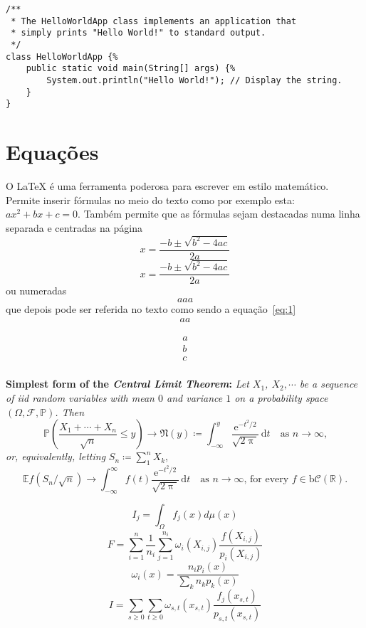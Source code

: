 \lstset{language=Java, caption=Hello World, label=lst:HelloWorld}
\begin{lstlisting}
/** 
 * The HelloWorldApp class implements an application that
 * simply prints "Hello World!" to standard output.
 */
class HelloWorldApp {%
    public static void main(String[] args) {%
        System.out.println("Hello World!"); // Display the string.
    }
}
\end{lstlisting}

\section{Equações}

O LaTeX é uma ferramenta poderosa para escrever em estilo matemático. Permite inserir fórmulas no meio do texto como por exemplo esta: $ax^2 + bx + c = 0$. Também permite que as fórmulas sejam destacadas numa linha separada e centradas na página 
$$x = \frac{-b \pm \sqrt{b^2-4ac}}{2a}$$
\[x = \frac{-b \pm \sqrt{b^2-4ac}}{2a}\]
ou numeradas 
\begin{equation}
aaa
\label{eq:1}
\end{equation}
que depois pode ser referida no texto como sendo a equação~\ref{eq:1}
$$\begin{array}{l}
aa
\end{array}
$$

\begin{eqnarray}
a\\
b\\
c\\
\end{eqnarray}

\textbf{Simplest form of the \textit{Central Limit Theorem}:} \textit{Let
$X_1$, $X_2,\cdots$ be a sequence of iid random variables with mean $0$ 
and variance $1$ on a probability space $(\Omega,\mathcal{F},\mathbb{P})$. Then}
\[\mathbb{P}\left(\frac{X_1+\cdots+X_n}{\sqrt{n}}\le y\right)\to\mathfrak{N}(y)\coloneq
\int_{-\infty}^y \frac{\mathrm{e}^{-t^2/2}}{\sqrt{2\uppi}}\,
\mathrm{d}t\quad\mbox{as $n\to\infty$,}\]
\textit{or, equivalently, letting} $S_n\coloneq\sum_1^n X_k$,
\[\mathbb{E} f\left(S_n/\sqrt{n}\right)\to \int_{-\infty}^\infty f(t)
\frac{\mathrm{e}^{-t^2/2}}{\sqrt{2\uppi}}\,\mathrm{d}t
\quad\mbox{as $n\to\infty$, for every $f\in\mathrm{b}
\mathcal{C}(\mathbb{R})$.}\]

\begin{equation}
I_j=\int_\Omega f_j(x)d\mu (x)
\label{eq:path_int}
\end{equation}
\begin{equation}
F = \sum_{i=1}^n \frac{1}{n_i} \sum_{j=1}^{n_i} \omega_i (X_{i,j}) \frac{f(X_{i,j})}{p_i (X_{i,j})}
\label{eq:mis}
\end{equation}
\begin{equation}
\omega_i (x) = \frac{n_i p_i (x)}{\sum _k n_k p_k (x)}
\label{eq:balance}
\end{equation}
\begin{equation}
I=\sum_{s \geq 0}\sum_{t \geq 0}\omega_{s,t}(x_{s,t})\frac{f_j (x_{s,t})}{p_{s,t}(x_{s,t})}
\label{eq:bpt}
\end{equation}

